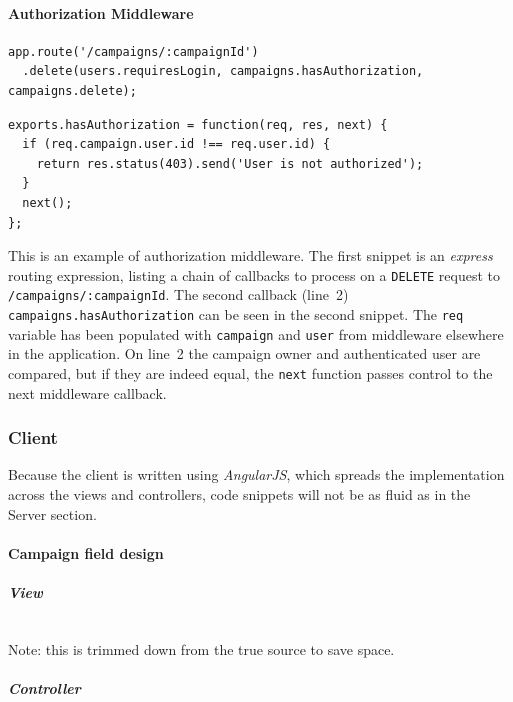 \documentclass{article}
\begin{document}
	\paragraph{Authorization Middleware}

	\begin{verbatim}
app.route('/campaigns/:campaignId')
  .delete(users.requiresLogin, campaigns.hasAuthorization, campaigns.delete);
	\end{verbatim}

	\begin{verbatim}
exports.hasAuthorization = function(req, res, next) {
  if (req.campaign.user.id !== req.user.id) {
    return res.status(403).send('User is not authorized');
  }
  next();
};
	\end{verbatim}

	This is an example of authorization middleware. The first snippet is an \emph{express} routing expression, listing a chain of callbacks to process on a \texttt{DELETE} request to \texttt{/campaigns/:campaignId}. The second callback (line~2) \texttt{campaigns.hasAuthorization} can be seen in the second snippet. The \texttt{req} variable has been populated with \texttt{campaign} and \texttt{user} from middleware elsewhere in the application. On line~2 the campaign owner and authenticated user are compared, but if they are indeed equal, the \texttt{next} function passes control to the next middleware callback.

	\subsubsection{Client}

	Because the client is written using \emph{AngularJS}, which spreads the implementation across the views and controllers, code snippets will not be as fluid as in the Server section.

	\paragraph{Campaign field design}

	\subparagraph{View}
	\inputminted[frame=single,linenos,breaklines,fontsize=\scriptsize]{xml}{snippets/campaign-field-design.html}
	Note: this is trimmed down from the true source to save space.

	\subparagraph{Controller}
	\inputminted[frame=single,linenos,breaklines,fontsize=\scriptsize]{js}{snippets/campaign-field-design.js}
\end{document}
